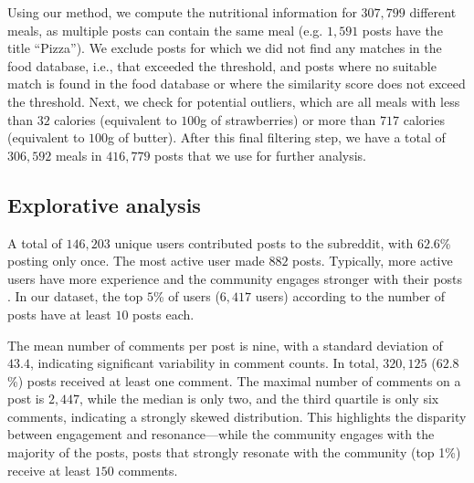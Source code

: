 Using our method, we compute the nutritional information for $307,799$ different meals, as multiple posts can contain the same meal (e.g. $1,591$ posts have the title ``Pizza'').
We exclude posts for which we did not find any matches in the food database, i.e., that exceeded the threshold, and posts where no suitable match is found in the food database or where the similarity score does not exceed the threshold.
Next, we check for potential outliers, which are all meals with less than $32$ calories (equivalent to $100$g of strawberries) or more than $717$ calories (equivalent to $100$g of butter).
After this final filtering step, we have a total of $306,592$ meals in $416,779$ posts that we use for further analysis.

\subsection{Explorative analysis}

A total of $146,203$ unique users contributed posts to the subreddit, with $62.6$\% posting only once.
The most active user made $882$ posts. Typically, more active users have more experience and the community engages stronger with their posts \cite{rokicki_how_2017}. 
In our dataset, the top $5$\% of users ($6,417$ users) according to the number of posts have at least $10$ posts each.

The mean number of comments per post is nine, with a standard deviation of $43.4$, indicating significant variability in comment counts. In total, $320,125$ ($62.8$\%) posts received at least one comment.  
The maximal number of comments on a post is $2,447$, while the median is only two, and the third quartile is only six comments, indicating a strongly skewed distribution.  
This highlights the disparity between engagement and resonance---while the community engages with the majority of the posts, posts that strongly resonate with the community (top 1\%) receive at least $150$ comments.

